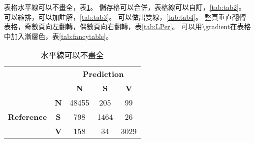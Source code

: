 表格水平線可以不畫全，表\ref{tab:tab1}。
儲存格可以合併，表格線可以自訂，\ref{tab:tab2}。
可以縮排，可以加註解，\ref{tab:tab3}。
可以做出雙線，\ref{tab:tab4}。
整頁垂直翻轉表格，奇數頁向左翻轉，偶數頁向右翻轉，表\ref{tab:LPer}。
可以用\textbackslash gradient{}在表格中加入漸層色，表\ref{tab:fancytable}。

\renewcommand{\arraystretch}{1.2}
\begin{table}[!htb]
    \centering
    \caption{水平線可以不畫全}
    \label{tab:tab1}
    \begin{tabular}{ccccc}
        \toprule
        & & \multicolumn{3}{c}{\textbf{Prediction}} \\
        \cmidrule{3-5}
        & & \textbf{N} & \textbf{S} & \textbf{V} \\
        \midrule
        \multirow{3}{*}{\textbf{Reference}} & \textbf{N} & 48455 & 205 & 99 \\
        & \textbf{S} & 798 & 1464 & 26 \\
        & \textbf{V} & 158 & 34 & 3029 \\
        \bottomrule
    \end{tabular}
\end{table}

\begin{table}[!htb]
    \centering
    \caption{儲存格可以合併。表格線可以自訂}
    \label{tab:tab2}
    \renewcommand\arraystretch{1.5}{
    }
\end{table}

